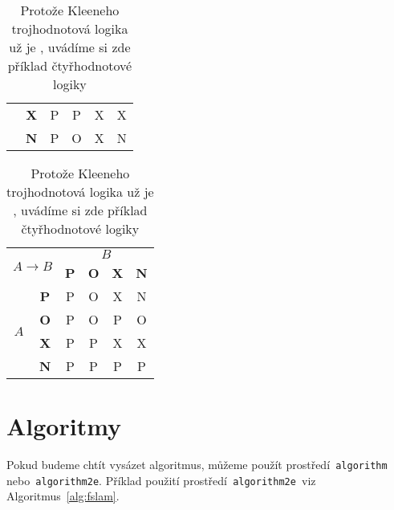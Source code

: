\documentclass[a4paper, 11pt]{article}
\begin{document}
\begin{table}[h!]
\begin{tabular}{|c|c|c|c|c|c|}
		                                                  & \textbf{X}               & P          & P          & X          & X  \\ \cline{2-6}
		                                                  & \textbf{N}               & P          & O          & X          & N  \\ \cline{2-6}
		\hline
	\end{tabular}
	\begin{tabular}{|c|c|c|c|c|c|}
		\hline
		\multicolumn{2}{|c|}{\multirow{2}{*}{$A \rightarrow B$}} & \multicolumn{4}{c|}{$B$}                                             \\\cline{3-6}
		\multicolumn{2}{|c|}{ }                                  & \textbf{P}               & \textbf{O} & \textbf{X} & \textbf{N}      \\
		\hline
		\multirow{4}{*}{$A$}
		                                                         & \textbf{P}               & P          & O          & X          & N  \\ \cline{2-6}
		                                                         & \textbf{O}               & P          & O          & P          & O  \\ \cline{2-6}
		                                                         & \textbf{X}               & P          & P          & X          & X  \\ \cline{2-6}
		                                                         & \textbf{N}               & P          & P          & P          & P  \\ \cline{2-6}
		\hline
	\end{tabular}

	\caption{Protože Kleeneho trojhodnotová logika už je ,
		uvádíme si zde příklad čtyřhodnotové logiky}
	\label{tab:log}

\end{table}
\bigskip


\pagebreak

\section{Algoritmy}

Pokud budeme chtít vysázet algoritmus, můžeme použít
prostředí\texttt{ algorithm\footnotemark[2] }
nebo\texttt{ algorithm2e\footnotemark[3]}. Příklad použití
prostředí\texttt{ algorithm2e }viz Algoritmus~\ref{alg:fslam}.
\end{document}
